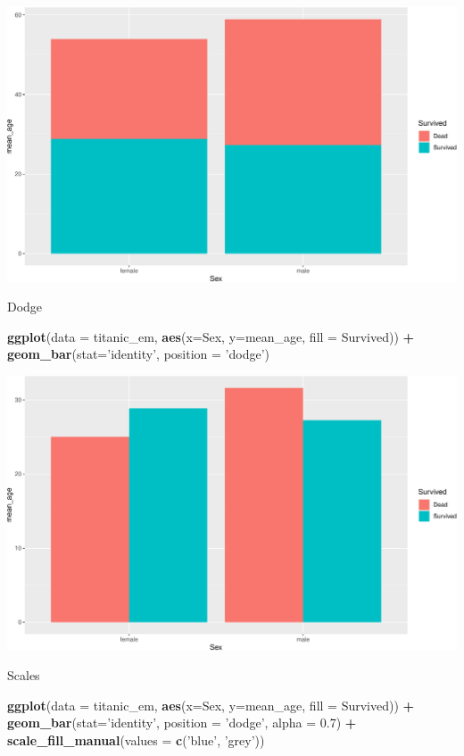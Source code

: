 \documentclass[
]{book}
\newenvironment{Shaded}{\begin{snugshade}}{\end{snugshade}}
\newcommand{\DataTypeTok}[1]{\textcolor[rgb]{0.13,0.29,0.53}{#1}}
\newcommand{\FloatTok}[1]{\textcolor[rgb]{0.00,0.00,0.81}{#1}}
\newcommand{\KeywordTok}[1]{\textcolor[rgb]{0.13,0.29,0.53}{\textbf{#1}}}
\newcommand{\NormalTok}[1]{#1}
\newcommand{\OperatorTok}[1]{\textcolor[rgb]{0.81,0.36,0.00}{\textbf{#1}}}
\newcommand{\StringTok}[1]{\textcolor[rgb]{0.31,0.60,0.02}{#1}}
\begin{document}
\includegraphics{figures/unnamed-chunk-145-1.pdf}

Dodge

\begin{Shaded}
\begin{Highlighting}[]
\KeywordTok{ggplot}\NormalTok{(}\DataTypeTok{data =}\NormalTok{ titanic_em, }\KeywordTok{aes}\NormalTok{(}\DataTypeTok{x=}\NormalTok{Sex, }\DataTypeTok{y=}\NormalTok{mean_age, }\DataTypeTok{fill =}\NormalTok{ Survived)) }\OperatorTok{+}\StringTok{ }\KeywordTok{geom_bar}\NormalTok{(}\DataTypeTok{stat=}\StringTok{'identity'}\NormalTok{, }\DataTypeTok{position =} \StringTok{'dodge'}\NormalTok{) }
\end{Highlighting}
\end{Shaded}

\includegraphics{figures/unnamed-chunk-146-1.pdf}

Scales

\begin{Shaded}
\begin{Highlighting}[]
\KeywordTok{ggplot}\NormalTok{(}\DataTypeTok{data =}\NormalTok{ titanic_em, }\KeywordTok{aes}\NormalTok{(}\DataTypeTok{x=}\NormalTok{Sex, }\DataTypeTok{y=}\NormalTok{mean_age, }\DataTypeTok{fill =}\NormalTok{ Survived)) }\OperatorTok{+}\StringTok{ }\KeywordTok{geom_bar}\NormalTok{(}\DataTypeTok{stat=}\StringTok{'identity'}\NormalTok{, }\DataTypeTok{position =} \StringTok{'dodge'}\NormalTok{, }\DataTypeTok{alpha =} \FloatTok{0.7}\NormalTok{) }\OperatorTok{+}\StringTok{ }\KeywordTok{scale_fill_manual}\NormalTok{(}\DataTypeTok{values =} \KeywordTok{c}\NormalTok{(}\StringTok{'blue'}\NormalTok{, }\StringTok{'grey'}\NormalTok{))}
\end{Highlighting}
\end{Shaded}
\end{document}
